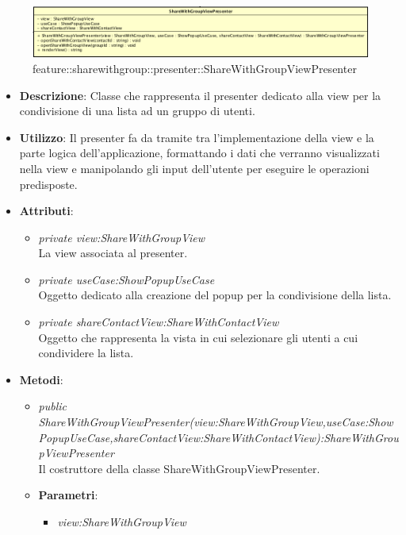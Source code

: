 \label{feature::sharewithgroup::presenter::ShareWithGroupViewPresenter}
\begin{figure}[ht]
	\centering
	\includegraphics[scale=0.5]{Sezioni/SottosezioniST/img/app/ShareWithGroupViewPresenter.png}
	\caption{feature::sharewithgroup::presenter::ShareWithGroupViewPresenter}
\end{figure}

\begin{itemize}
\item \textbf{Descrizione}: Classe che rappresenta il presenter dedicato alla view per la condivisione di una lista ad un gruppo di utenti.
\item \textbf{Utilizzo}: Il presenter fa da tramite tra l'implementazione della view e la parte logica dell'applicazione, formattando i dati che verranno visualizzati nella view e manipolando gli input dell'utente per eseguire le operazioni predisposte.
\item \textbf{Attributi}: 
	\begin{itemize}
	\item \textit{private view:ShareWithGroupView}\\
			La view associata al presenter.
	\item \textit{private useCase:ShowPopupUseCase}\\
		Oggetto dedicato alla creazione del popup per la condivisione della lista.
	\item \textit{private shareContactView:ShareWithContactView}\\
		Oggetto che rappresenta la vista in cui selezionare gli utenti a cui condividere la lista.
	\end{itemize} 
\item \textbf{Metodi}:
	\begin{itemize}
	\item \textit{public ShareWithGroupViewPresenter(view:ShareWithGroupView,useCase:ShowPopupUseCase,shareContactView:ShareWithContactView):ShareWithGroupViewPresenter}\\
	Il costruttore della classe ShareWithGroupViewPresenter.
			\item{\textbf{Parametri}: \begin{itemize}
			\item \textit{view:ShareWithGroupView}\\

\end{itemize}}
\end{itemize}
\end{itemize}
